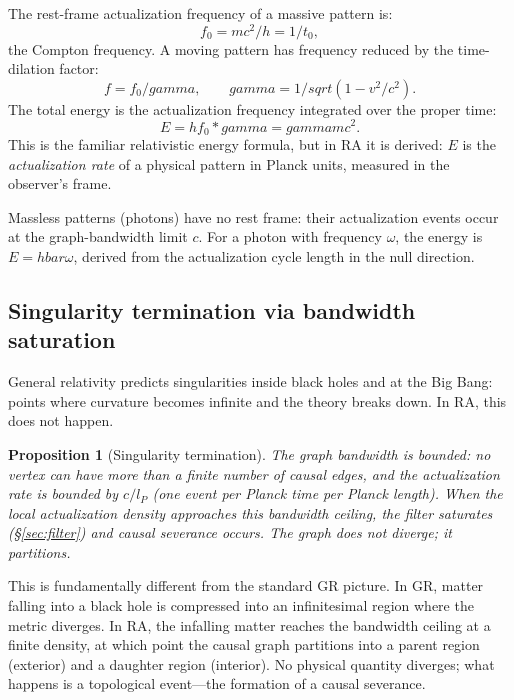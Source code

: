 \documentclass[11pt]{article}
\DeclareRobustCommand{\hbar}{\ensuremath{\hslash}}
\def\hbar{hbar}%
\def\ell{l}%
\def\gamma{gamma}%
\def\sqrt#1{sqrt(#1)}%
\def\frac#1#2{#1/#2}%
\def\cdot{*}%
\newtheorem{proposition}{Proposition}
\begin{document}
The rest-frame actualization frequency of a massive pattern is:
\begin{equation}
f_0 = \frac{mc^2}{h} = \frac{1}{t_0},
\end{equation}
the Compton frequency. A moving pattern has frequency reduced by the time-dilation factor:
\begin{equation}
f = f_0/\gamma, \qquad \gamma = 1/\sqrt{1 - v^2/c^2}.
\end{equation}
The total energy is the actualization frequency integrated over the proper time:
\begin{equation}
E = h f_0 \cdot \gamma = \gamma m c^2.
\end{equation}
This is the familiar relativistic energy formula, but in RA it is derived: $E$ is the \emph{actualization rate} of a physical pattern in Planck units, measured in the observer's frame.

Massless patterns (photons) have no rest frame: their actualization events occur at the graph-bandwidth limit $c$. For a photon with frequency $\omega$, the energy is $E = \hbar\omega$, derived from the actualization cycle length in the null direction.

\subsection{Singularity termination via bandwidth saturation}

General relativity predicts singularities inside black holes and at the Big Bang: points where curvature becomes infinite and the theory breaks down. In RA, this does not happen.

\begin{proposition}[Singularity termination]
\label{prop:singularity}
The graph bandwidth is bounded: no vertex can have more than a finite number of causal edges, and the actualization rate is bounded by $c/\ell_P$ (one event per Planck time per Planck length). When the local actualization density approaches this bandwidth ceiling, the filter saturates (\S\ref{sec:filter}) and causal severance occurs. The graph does not diverge; it partitions.
\end{proposition}

This is fundamentally different from the standard GR picture. In GR, matter falling into a black hole is compressed into an infinitesimal region where the metric diverges. In RA, the infalling matter reaches the bandwidth ceiling at a finite density, at which point the causal graph partitions into a parent region (exterior) and a daughter region (interior). No physical quantity diverges; what happens is a topological event---the formation of a causal severance.
\end{document}
